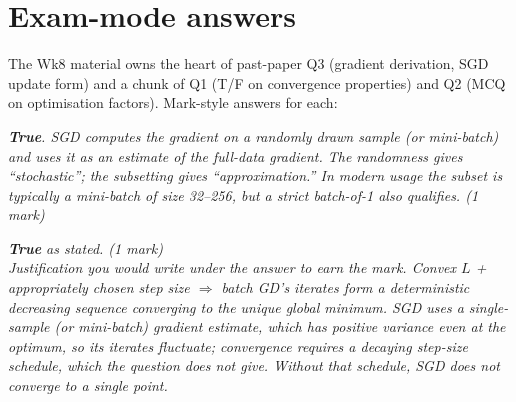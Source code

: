 \documentclass[11pt, a4paper]{article}
\begin{document}
\section{Exam-mode answers}

The Wk8 material owns the heart of past-paper Q3 (gradient derivation, SGD update form) and a chunk of Q1 (T/F on convergence properties) and Q2 (MCQ on optimisation factors). Mark-style answers for each:

\begin{exambox}
\textit{\textbf{True}. SGD computes the gradient on a randomly drawn sample (or mini-batch) and uses it as an estimate of the full-data gradient. The randomness gives ``stochastic''; the subsetting gives ``approximation.'' In modern usage the subset is typically a mini-batch of size 32--256, but a strict batch-of-1 also qualifies. (1 mark)}
\end{exambox}

\begin{exambox}
\textit{\textbf{True} as stated. (1 mark)}\\[0.3em]
\textit{\emph{Justification you would write under the answer to earn the mark.} Convex $L$ + appropriately chosen step size $\Rightarrow$ batch GD's iterates form a deterministic decreasing sequence converging to the unique global minimum. SGD uses a single-sample (or mini-batch) gradient estimate, which has positive variance even at the optimum, so its iterates fluctuate; convergence requires a decaying step-size schedule, which the question does not give. Without that schedule, SGD does not converge to a single point.}
\end{exambox}
\end{document}
